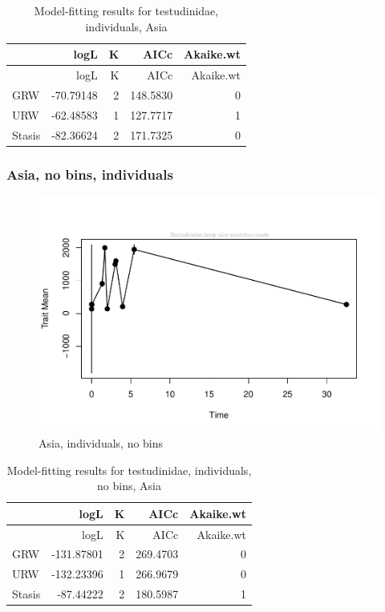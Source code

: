 \documentclass[]{article}
\begin{document}
\begin{longtable}[]{@{}lrrrr@{}}
\caption{Model-fitting results for testudinidae, individuals,
Asia}\tabularnewline
\toprule
& logL & K & AICc & Akaike.wt\tabularnewline
\midrule
\endfirsthead
\toprule
& logL & K & AICc & Akaike.wt\tabularnewline
\midrule
\endhead
GRW & -70.79148 & 2 & 148.5830 & 0\tabularnewline
URW & -62.48583 & 1 & 127.7717 & 1\tabularnewline
Stasis & -82.36624 & 2 & 171.7325 & 0\tabularnewline
\bottomrule
\end{longtable}

\newpage

\subsubsection{Asia, no bins,
individuals}\label{asia-no-bins-individuals}

\begin{figure}[htbp]
\centering
\includegraphics{MA_JJ_files/figure-latex/paleoTS, no bins individuals, Asia-1.pdf}
\caption{Asia, individuals, no bins}
\end{figure}

\begin{longtable}[]{@{}lrrrr@{}}
\caption{Model-fitting results for testudinidae, individuals, no bins,
Asia}\tabularnewline
\toprule
& logL & K & AICc & Akaike.wt\tabularnewline
\midrule
\endfirsthead
\toprule
& logL & K & AICc & Akaike.wt\tabularnewline
\midrule
\endhead
GRW & -131.87801 & 2 & 269.4703 & 0\tabularnewline
URW & -132.23396 & 1 & 266.9679 & 0\tabularnewline
Stasis & -87.44222 & 2 & 180.5987 & 1\tabularnewline
\bottomrule
\end{longtable}
\end{document}
